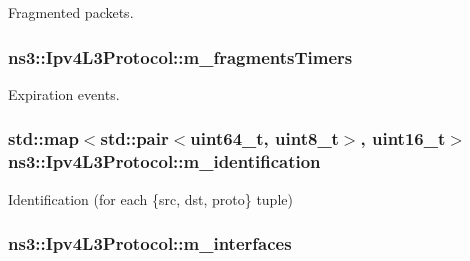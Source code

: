 Fragmented packets. 

\subsubsection[{\texorpdfstring{m\+\_\+fragments\+Timers}{m_fragmentsTimers}}]{ ns3\+::\+Ipv4\+L3\+Protocol\+::m\+\_\+fragments\+Timers\hspace{0.3cm}{\ttfamily [private]}}\hypertarget{classns3_1_1Ipv4L3Protocol_a3233e1de6e8f43299a353107adafbed2}{}\label{classns3_1_1Ipv4L3Protocol_a3233e1de6e8f43299a353107adafbed2}


Expiration events. 

\subsubsection[{\texorpdfstring{m\+\_\+identification}{m_identification}}]{\setlength{\rightskip}{0pt plus 5cm}std\+::map$<$std\+::pair$<$uint64\+\_\+t, uint8\+\_\+t$>$, uint16\+\_\+t$>$ ns3\+::\+Ipv4\+L3\+Protocol\+::m\+\_\+identification\hspace{0.3cm}{\ttfamily [private]}}\hypertarget{classns3_1_1Ipv4L3Protocol_a64746ae9a15d32cd8d0b4467d6b66949}{}\label{classns3_1_1Ipv4L3Protocol_a64746ae9a15d32cd8d0b4467d6b66949}


Identification (for each \{src, dst, proto\} tuple) 

\subsubsection[{\texorpdfstring{m\+\_\+interfaces}{m_interfaces}}]{ ns3\+::\+Ipv4\+L3\+Protocol\+::m\+\_\+interfaces\hspace{0.3cm}{\ttfamily [private]}}\hypertarget{classns3_1_1Ipv4L3Protocol_a0b0f15b24a02f2c9a5d576f633aa2770}{}\label{classns3_1_1Ipv4L3Protocol_a0b0f15b24a02f2c9a5d576f633aa2770}


